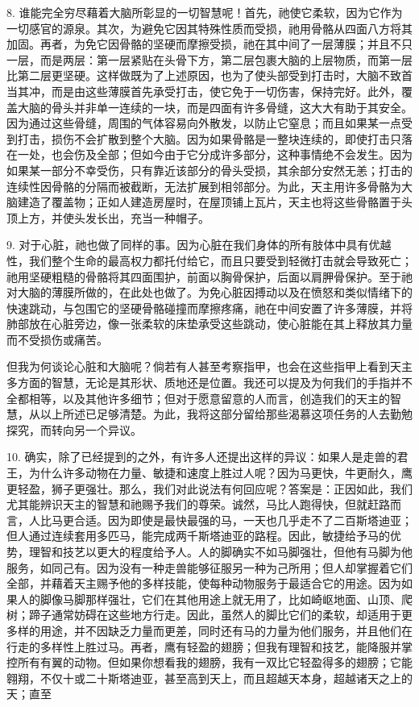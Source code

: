8. 谁能完全穷尽藉着大脑所彰显的一切智慧呢！首先，祂使它柔软，因为它作为一切感官的源泉。其次，为避免它因其特殊性质而受损，祂用骨骼从四面八方将其加固。再者，为免它因骨骼的坚硬而摩擦受损，祂在其中间了一层薄膜；并且不只一层，而是两层：第一层紧贴在头骨下方，第二层包裹大脑的上层物质，而第一层比第二层更坚硬。这样做既为了上述原因，也为了使头部受到打击时，大脑不致首当其冲，而是由这些薄膜首先承受打击，使它免于一切伤害，保持完好。此外，覆盖大脑的骨头并非单一连续的一块，而是四面有许多骨缝，这大大有助于其安全。因为通过这些骨缝，周围的气体容易向外散发，以防止它窒息；而且如果某一点受到打击，损伤不会扩散到整个大脑。因为如果骨骼是一整块连续的，即使打击只落在一处，也会伤及全部；但如今由于它分成许多部分，这种事情绝不会发生。因为如果某一部分不幸受伤，只有靠近该部分的骨头受损，其余部分安然无恙；打击的连续性因骨骼的分隔而被截断，无法扩展到相邻部分。为此，天主用许多骨骼为大脑建造了覆盖物；正如人建造房屋时，在屋顶铺上瓦片，天主也将这些骨骼置于头顶上方，并使头发长出，充当一种帽子。\par

9. 对于心脏，祂也做了同样的事。因为心脏在我们身体的所有肢体中具有优越性，我们整个生命的最高权力都托付给它，而且只要受到轻微打击就会导致死亡；祂用坚硬粗糙的骨骼将其四面围护，前面以胸骨保护，后面以肩胛骨保护。至于祂对大脑的薄膜所做的，在此处也做了。为免心脏因搏动以及在愤怒和类似情绪下的快速跳动，与包围它的坚硬骨骼碰撞而摩擦疼痛，祂在中间安置了许多薄膜，并将肺部放在心脏旁边，像一张柔软的床垫承受这些跳动，使心脏能在其上释放其力量而不受损伤或痛苦。\par

但我为何谈论心脏和大脑呢？倘若有人甚至考察指甲，也会在这些指甲上看到天主多方面的智慧，无论是其形状、质地还是位置。我还可以提及为何我们的手指并不全都相等，以及其他许多细节；但对于愿意留意的人而言，创造我们的天主的智慧，从以上所述已足够清楚。为此，我将这部分留给那些渴慕这项任务的人去勤勉探究，而转向另一个异议。\par

10. 确实，除了已经提到的之外，有许多人还提出这样的异议：如果人是走兽的君王，为什么许多动物在力量、敏捷和速度上胜过人呢？因为马更快，牛更耐久，鹰更轻盈，狮子更强壮。那么，我们对此说法有何回应呢？答案是：正因如此，我们尤其能辨识天主的智慧和祂赐予我们的尊荣。诚然，马比人跑得快，但就赶路而言，人比马更合适。因为即使是最快最强的马，一天也几乎走不了二百斯塔迪亚；但人通过连续套用多匹马，能完成两千斯塔迪亚的路程。因此，敏捷给予马的优势，理智和技艺以更大的程度给予人。人的脚确实不如马脚强壮，但他有马脚为他服务，如同己有。因为没有一种走兽能够征服另一种为己所用；但人却掌握着它们全部，并藉着天主赐予他的多样技能，使每种动物服务于最适合它的用途。因为如果人的脚像马脚那样强壮，它们在其他用途上就无用了，比如崎岖地面、山顶、爬树；蹄子通常妨碍在这些地方行走。因此，虽然人的脚比它们的柔软，却适用于更多样的用途，并不因缺乏力量而更差，同时还有马的力量为他们服务，并且他们在行走的多样性上胜过马。再者，鹰有轻盈的翅膀；但我有理智和技艺，能降服并掌控所有有翼的动物。但如果你想看我的翅膀，我有一双比它轻盈得多的翅膀；它能翱翔，不仅十或二十斯塔迪亚，甚至高到天上，而且超越天本身，超越诸天之上的天；直至\par

